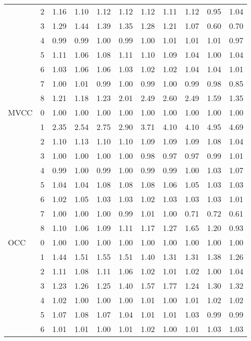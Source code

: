 \begin{tabular}{llrrrrrrrrr}
       & 2 & 1.16 & 1.10 & 1.12 & 1.12 & 1.12 & 1.11 & 1.12 & 0.95 & 1.04 \\
       & 3 & 1.29 & 1.44 & 1.39 & 1.35 & 1.28 & 1.21 & 1.07 & 0.60 & 0.70 \\
       & 4 & 0.99 & 0.99 & 1.00 & 0.99 & 1.00 & 1.01 & 1.01 & 1.01 & 0.97 \\
       & 5 & 1.11 & 1.06 & 1.08 & 1.11 & 1.10 & 1.09 & 1.04 & 1.00 & 1.04 \\
       & 6 & 1.03 & 1.06 & 1.06 & 1.03 & 1.02 & 1.02 & 1.04 & 1.04 & 1.01 \\
       & 7 & 1.00 & 1.01 & 0.99 & 1.00 & 0.99 & 1.00 & 0.99 & 0.98 & 0.85 \\
       & 8 & 1.21 & 1.18 & 1.23 & 2.01 & 2.49 & 2.60 & 2.49 & 1.59 & 1.35 \\
MVCC & 0 & 1.00 & 1.00 & 1.00 & 1.00 & 1.00 & 1.00 & 1.00 & 1.00 & 1.00 \\
       & 1 & 2.35 & 2.54 & 2.75 & 2.90 & 3.71 & 4.10 & 4.10 & 4.95 & 4.69 \\
       & 2 & 1.10 & 1.13 & 1.10 & 1.10 & 1.09 & 1.09 & 1.09 & 1.08 & 1.04 \\
       & 3 & 1.00 & 1.00 & 1.00 & 1.00 & 0.98 & 0.97 & 0.97 & 0.99 & 1.01 \\
       & 4 & 0.99 & 1.00 & 0.99 & 1.00 & 0.99 & 0.99 & 1.00 & 1.03 & 1.07 \\
       & 5 & 1.04 & 1.04 & 1.08 & 1.08 & 1.08 & 1.06 & 1.05 & 1.03 & 1.03 \\
       & 6 & 1.02 & 1.05 & 1.03 & 1.03 & 1.02 & 1.03 & 1.03 & 1.03 & 1.01 \\
       & 7 & 1.00 & 1.00 & 1.00 & 0.99 & 1.01 & 1.00 & 0.71 & 0.72 & 0.61 \\
       & 8 & 1.10 & 1.06 & 1.09 & 1.11 & 1.17 & 1.27 & 1.65 & 1.20 & 0.93 \\
OCC & 0 & 1.00 & 1.00 & 1.00 & 1.00 & 1.00 & 1.00 & 1.00 & 1.00 & 1.00 \\
       & 1 & 1.44 & 1.51 & 1.55 & 1.51 & 1.40 & 1.31 & 1.31 & 1.38 & 1.26 \\
       & 2 & 1.11 & 1.08 & 1.11 & 1.06 & 1.02 & 1.01 & 1.02 & 1.00 & 1.04 \\
       & 3 & 1.23 & 1.26 & 1.25 & 1.40 & 1.57 & 1.77 & 1.24 & 1.30 & 1.32 \\
       & 4 & 1.02 & 1.00 & 1.00 & 1.00 & 1.01 & 1.00 & 1.01 & 1.02 & 1.02 \\
       & 5 & 1.07 & 1.08 & 1.07 & 1.04 & 1.01 & 1.01 & 1.03 & 0.99 & 0.99 \\
       & 6 & 1.01 & 1.01 & 1.00 & 1.01 & 1.02 & 1.00 & 1.01 & 1.03 & 1.03 \\

\end{tabular}
